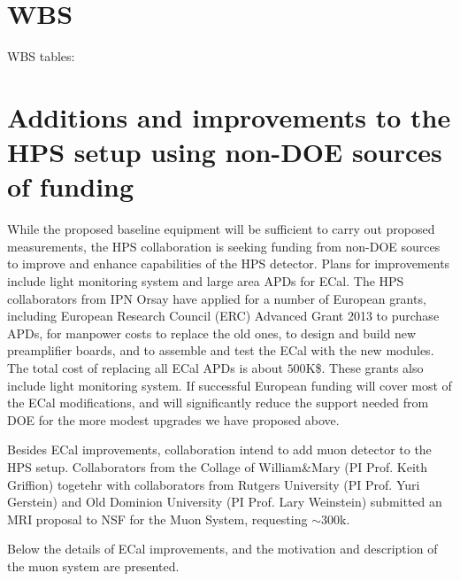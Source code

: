 \appendix
\renewcommand*{\thesubsection}{\thesection.\arabic{subsection}}
\renewcommand*{\thesubsubsection}{\thesubsection.\arabic{subsubsection}}

\section{WBS}
\label{sec:wbs}
WBS tables:
\clearpage



\section{Additions and improvements to the HPS setup using non-DOE sources of funding}

While the proposed baseline equipment will be sufficient to carry out proposed measurements, the HPS collaboration is seeking funding from non-DOE sources to improve and enhance capabilities of the HPS detector. Plans for improvements include light monitoring system and large area APDs for ECal.  The HPS collaborators from IPN Orsay have applied for a number of European grants, including European Research Council (ERC) Advanced Grant 2013 to purchase APDs, for manpower costs to replace the old ones, to design and build 
new preamplifier boards, and to assemble and test the ECal with the new modules. The total cost of replacing all ECal APDs is about $500$K\$. 
These grants also include light monitoring system. If successful European funding will cover most of the ECal modifications, and will significantly reduce the support needed from DOE for the more modest upgrades we have proposed above. 

Besides ECal improvements, collaboration intend to add muon detector to the HPS setup. Collaborators from the Collage of William\&Mary (PI Prof. Keith Griffion) togetehr with collaborators from Rutgers University (PI Prof. Yuri Gerstein) and Old Dominion University (PI Prof. Lary Weinstein) submitted an MRI proposal to NSF for the Muon System, requesting $\sim 300$k.  

Below the details of ECal improvements, and the motivation and description of the muon system are presented. 

